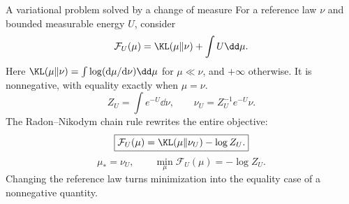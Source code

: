 \begin{frame}[t]{A variational problem solved by a change of measure}
\hypertarget{main:gibbs}{}
For a reference law $\nu$ and bounded measurable energy $U$, consider
\begin{equation*}
  \mathcal F_U(\mu)=\KL(\mu\Vert\nu)+\int U\dd\mu.
\end{equation*}
Here $\KL(\mu\Vert\nu)=\int\log(\mathrm d\mu/\mathrm d\nu)\dd\mu$ for $\mu\ll\nu$,
and $+\infty$ otherwise. It is nonnegative, with equality exactly when $\mu=\nu$.
\begin{equation*}
  Z_U=\int e^{-U}\dd\nu,\qquad \nu_U=Z_U^{-1}e^{-U}\nu.
\end{equation*}
The Radon--Nikodym chain rule rewrites the entire objective:
\begin{equation*}
  \boxed{\mathcal F_U(\mu)=\KL(\mu\Vert\nu_U)-\log Z_U.}
\end{equation*}
\begin{equation*}
  \mu_*=\nu_U,\qquad \min_\mu\mathcal F_U(\mu)=-\log Z_U.
\end{equation*}
Changing the reference law turns minimization into the equality case of a nonnegative quantity.
\end{frame}
